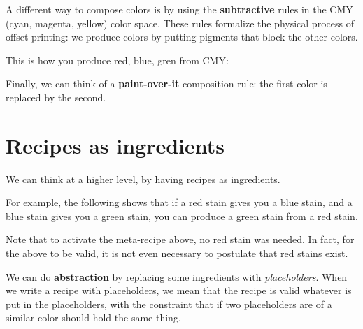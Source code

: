 \begin{center}
\end{center}


A different way to compose colors is by using the \textbf{subtractive} rules in the CMY (cyan, magenta, yellow) color space.
These rules formalize the physical process of offset printing: we produce colors by putting pigments that block the other colors.

\begin{center}
\end{center}

This is how you produce red, blue, gren from CMY:
\begin{center}
\end{center}

Finally, we can think of a \textbf{paint-over-it} composition rule: the first color is replaced by the second.



\section{Recipes as ingredients}

We can think at a higher level, by having recipes as ingredients.


For example, the following shows that if a red stain gives you a blue stain, and a blue stain gives you a green stain, you can produce a green stain from a red stain.



Note that to activate the meta-recipe above, no red stain was needed.
In fact, for the above to be valid, it is not even necessary to postulate that red stains exist.

We can do \textbf{abstraction} by replacing some ingredients with \emph{placeholders}.
When we write a recipe with placeholders, we mean that the recipe is valid whatever is put in the placeholders, with the constraint that if two placeholders are of a similar color should hold the same thing.

